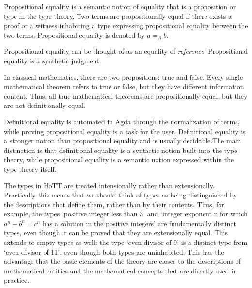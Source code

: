 \documentclass{article}
\begin{document}
\begin{definition}
  Propositional equality is a semantic notion of equality that is a proposition or type in the type theory. Two terms are propositionally equal if there exists a proof or a witness inhabiting a type expressing propositional equality between the two terms. Propositional equality is denoted by $a =_{A} b$.
\end{definition}

\begin{remark}[?]
  Propositional equality can be thought of as an equality of \emph{reference}. Propositional equality is a synthetic judgment.
\end{remark}

\begin{example}[?]
 In classical mathematics, there are two propositions: true and false. Every single mathematical theorem refers to true or false, but they have different information content. Thus, all true mathematical theorems are propositionally equal, but they are not definitionally equal.
\end{example}

\begin{remark}
  Definitional equality is automated in Agda through the normalization of terms, while proving propositional equality is a task for the user. Definitional equality is a stronger notion than propositional equality and is usually decidable.The main distinction is that definitional equality is a syntactic notion built into the type theory, while propositional equality is a semantic notion expressed within the type theory itself.
\end{remark}

\begin{remark}
  The types in HoTT are treated intensionally rather than extensionally. Practically this means that we should think of types as being distinguished by the descriptions that define them, rather than by their contents. Thus, for example, the types ‘positive integer less than 3’ and ‘integer exponent n for which $a^n + b^n = c^n$ has a solution in the positive integers’ are fundamentally distinct types, even though it can be proved that they are extensionally equal. This extends to empty types as well: the type ‘even divisor of 9’ is a distinct type from ‘even divisor of 11’, even though both types are uninhabited. This has the advantage that the basic elements of the theory are closer to the descriptions of mathematical entities and the mathematical concepts that are directly used in practice.
\end{remark}
\end{document}
